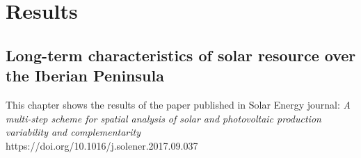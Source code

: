 \part{Results}


\chapter{Long-term characteristics of solar resource over the Iberian Peninsula\label{multi}}

\blfootnote
{This chapter shows the results of the paper published in Solar Energy journal: \textit{A multi-step scheme for spatial analysis of solar and photovoltaic production variability and complementarity}\\
https://doi.org/10.1016/j.solener.2017.09.037}

